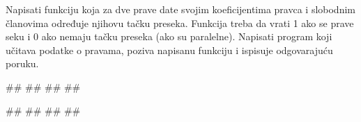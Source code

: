 \begin{Exercise}[label=v2.2_03] 
   Napisati funkciju koja za dve prave date svojim koeficijentima
   pravca i slobodnim članovima određuje njihovu tačku preseka. 
   Funkcija treba da vrati 1 ako se prave seku i 0 ako nemaju
   tačku preseka (ako su paralelne). Napisati program
   koji učitava podatke o pravama, poziva napisanu funkciju i 
   ispisuje odgovarajuću poruku.\\
\begin{miditest}
\begin{upotreba}{1}
#\naslovInt#
##
##
##
\end{upotreba}
\end{miditest}
\begin{miditest}
\begin{upotreba}{2}
#\naslovInt#
##
##
##
\end{upotreba}
\end{miditest}

\end{Exercise}
\begin{Answer}[ref=v2.2_03]
\end{Answer}

